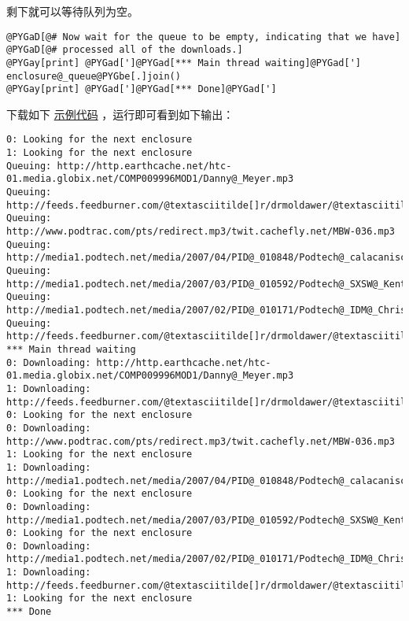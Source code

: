 \documentclass[a4paper,10pt,english]{manual}
\begin{document}
剩下就可以等待队列为空。

\begin{Verbatim}[commandchars=@\[\]]
@PYGaD[@# Now wait for the queue to be empty, indicating that we have]
@PYGaD[@# processed all of the downloads.]
@PYGay[print] @PYGad[']@PYGad[*** Main thread waiting]@PYGad[']
enclosure@_queue@PYGbe[.]join()
@PYGay[print] @PYGad[']@PYGad[*** Done]@PYGad[']
\end{Verbatim}

下载如下 \href{http://www.doughellmann.com/PyMOTW/fetch\_podcasts.py}{示例代码} ，运行即可看到如下输出：

\begin{Verbatim}[commandchars=@\[\]]
0: Looking for the next enclosure
1: Looking for the next enclosure
Queuing: http://http.earthcache.net/htc-01.media.globix.net/COMP009996MOD1/Danny@_Meyer.mp3
Queuing: http://feeds.feedburner.com/@textasciitilde[]r/drmoldawer/@textasciitilde[]5/104445110/moldawerinthemorning@_show34@_032607.mp3
Queuing: http://www.podtrac.com/pts/redirect.mp3/twit.cachefly.net/MBW-036.mp3
Queuing: http://media1.podtech.net/media/2007/04/PID@_010848/Podtech@_calacaniscast22@_ipod.mp4
Queuing: http://media1.podtech.net/media/2007/03/PID@_010592/Podtech@_SXSW@_KentBrewster@_ipod.mp4
Queuing: http://media1.podtech.net/media/2007/02/PID@_010171/Podtech@_IDM@_ChrisOBrien2.mp3
Queuing: http://feeds.feedburner.com/@textasciitilde[]r/drmoldawer/@textasciitilde[]5/96188661/moldawerinthemorning@_show30@_022607.mp3
*** Main thread waiting
0: Downloading: http://http.earthcache.net/htc-01.media.globix.net/COMP009996MOD1/Danny@_Meyer.mp3
1: Downloading: http://feeds.feedburner.com/@textasciitilde[]r/drmoldawer/@textasciitilde[]5/104445110/moldawerinthemorning@_show34@_032607.mp3
0: Looking for the next enclosure
0: Downloading: http://www.podtrac.com/pts/redirect.mp3/twit.cachefly.net/MBW-036.mp3
1: Looking for the next enclosure
1: Downloading: http://media1.podtech.net/media/2007/04/PID@_010848/Podtech@_calacaniscast22@_ipod.mp4
0: Looking for the next enclosure
0: Downloading: http://media1.podtech.net/media/2007/03/PID@_010592/Podtech@_SXSW@_KentBrewster@_ipod.mp4
0: Looking for the next enclosure
0: Downloading: http://media1.podtech.net/media/2007/02/PID@_010171/Podtech@_IDM@_ChrisOBrien2.mp3
1: Downloading: http://feeds.feedburner.com/@textasciitilde[]r/drmoldawer/@textasciitilde[]5/96188661/moldawerinthemorning@_show30@_022607.mp3
1: Looking for the next enclosure
*** Done
\end{Verbatim}

\resetcurrentobjects
\end{document}
